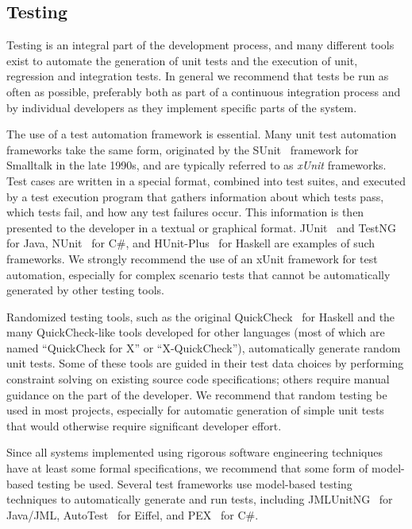\subsection{Testing}

Testing is an integral part of the development process, and many
different tools exist to automate the generation of unit tests and the
execution of unit, regression and integration tests. In general we
recommend that tests be run as often as possible, preferably both as
part of a continuous integration process and by individual developers
as they implement specific parts of the system. 

The use of a test automation framework is essential. Many unit test
automation frameworks take the same form, originated by the
SUnit~\cite{SUnit} framework for Smalltalk in the late 1990s, and are
typically referred to as \emph{xUnit} frameworks. Test cases are
written in a special format, combined into test suites, and executed
by a test execution program that gathers information about which tests
pass, which tests fail, and how any test failures occur. This
information is then presented to the developer in a textual or
graphical format.  JUnit~\cite{JUnit} and TestNG~\cite{TestNG} for
Java, NUnit~\cite{NUnit} for C\#, and HUnit-Plus~\cite{HUnit-Plus} for
Haskell are examples of such frameworks. We strongly recommend the use
of an xUnit framework for test automation, especially for complex
scenario tests that cannot be automatically generated by other testing
tools.

Randomized testing tools, such as the original
QuickCheck~\cite{QuickCheck} for Haskell and the many QuickCheck-like
tools developed for other languages (most of which are named
``QuickCheck for X'' or ``X-QuickCheck''), automatically generate
random unit tests. Some of these tools are guided in their test data
choices by performing constraint solving on existing source code
specifications; others require manual guidance on the part of the
developer. We recommend that random testing be used in most projects,
especially for automatic generation of simple unit tests that would
otherwise require significant developer effort.

Since all systems implemented using rigorous software engineering
techniques have at least some formal specifications, we recommend that
some form of model-based testing be used. Several test frameworks use
model-based testing techniques to automatically generate and run
tests, including JMLUnitNG~\cite{ZimmermanNagmoti10} for Java/JML,
AutoTest~\cite{AutoTest10} for Eiffel, and PEX~\cite{PEX08} for C\#.

